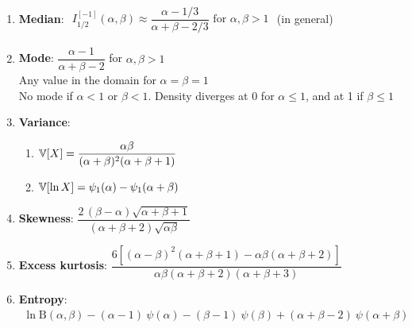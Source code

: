 \begin{enumerate}
    \item \textbf{Median}:  ${\displaystyle {\begin{matrix}I_{{1}/{2}}^{[-1]}(\alpha ,\beta ) \approx {\dfrac {\alpha -{{1}/{3}}}{\alpha +\beta -{{2}/{3}}}}{\text{ for }}\alpha ,\beta >1\end{matrix}}}$
    (in general)
    \hfill \cite{wiki/Beta_distribution}

    \item \textbf{Mode}: 
    ${\displaystyle {\dfrac {\alpha -1}{\alpha +\beta -2}}\!}$ for $\alpha, \beta > 1$
    \hfill \cite{wiki/Beta_distribution}
    \\
    Any value in the domain for $\alpha = \beta = 1$
    \hfill \cite{wiki/Beta_distribution}
    \\
    No mode if $\alpha<1$ or $\beta<1$. 
    Density diverges at 0 for $\alpha \leq 1$, and at 1 if $\beta \leq 1$
    \hfill \cite{wiki/Beta_distribution}

    \item \textbf{Variance}: 
    \begin{enumerate}
        \item 
        ${\displaystyle \mathbb{V} [X]={\dfrac {\alpha \beta }{(\alpha +\beta )^{2}(\alpha +\beta +1)}}\!}$
        \hfill \cite{wiki/Beta_distribution}

        \item 
        ${\displaystyle \mathbb{V} [\ln X]=\psi _{1}(\alpha )-\psi _{1}(\alpha +\beta )\!}$
        \hfill \cite{wiki/Beta_distribution}
    \end{enumerate}

    \item \textbf{Skewness}: $ {\displaystyle {\dfrac {2\,(\beta -\alpha ){\sqrt {\alpha +\beta +1}}}{(\alpha +\beta +2){\sqrt {\alpha \beta }}}}}$
    \hfill \cite{wiki/Beta_distribution}

    \item \textbf{Excess kurtosis}: $ {\displaystyle {\dfrac {6[(\alpha -\beta )^{2}(\alpha +\beta +1)-\alpha \beta (\alpha +\beta +2)]}{\alpha \beta (\alpha +\beta +2)(\alpha +\beta +3)}}}$
    \hfill \cite{wiki/Beta_distribution}

    \item \textbf{Entropy}: $   {\displaystyle {\begin{matrix}\ln \mathrm {B} (\alpha ,\beta )-(\alpha -1)\ \psi (\alpha )-(\beta -1)\ \psi (\beta )+(\alpha +\beta -2)\ \psi (\alpha +\beta )\end{matrix}}} $
    \hfill \cite{wiki/Beta_distribution}


\end{enumerate}
